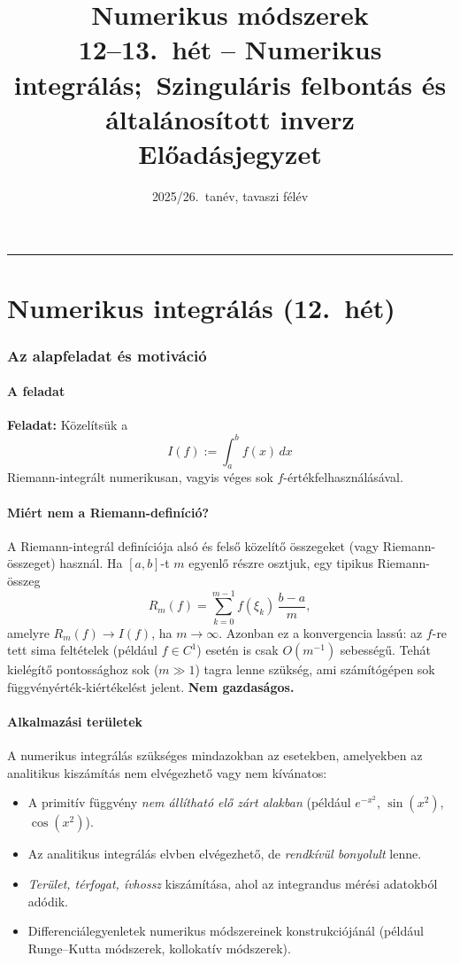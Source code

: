 \documentclass[a4paper,12pt]{article}
\title{\LARGE\bfseries Numerikus módszerek\\[6pt]
  \large 12--13.\ hét -- Numerikus integrálás;\
  Szinguláris felbontás és általánosított inverz\\[4pt]
  \normalsize Előadásjegyzet}
\date{2025/26.\ tanév, tavaszi félév}
\theoremstyle{mydef}
\begin{document}
\maketitle
\vspace{-1em}
\hrule
\vspace{0.5em}
\tableofcontents
\newpage

\part{Numerikus integrálás (12.\ hét)}

\section{Az alapfeladat és motiváció}

\subsection*{A feladat}

\textbf{Feladat:} Közelítsük a
\[
  I(f) := \int_a^b f(x)\,dx
\]
Riemann-integrált numerikusan, vagyis véges sok $f$-értékfelhasználásával.

\subsection*{Miért nem a Riemann-definíció?}

A Riemann-integrál definíciója alsó és felső közelítő összegeket (vagy Riemann-összeget) használ.
Ha $[a,b]$-t $m$ egyenlő részre osztjuk, egy tipikus Riemann-összeg
\[
  R_m(f) = \sum_{k=0}^{m-1} f(\xi_k)\,\frac{b-a}{m},
\]
amelyre $R_m(f)\to I(f)$, ha $m\to\infty$. Azonban ez a konvergencia lassú:
az $f$-re tett sima feltételek (például $f\in C^1$) esetén is csak $O(m^{-1})$
sebességű. Tehát kielégítő pontossághoz sok ($m\gg 1$) tagra lenne szükség,
ami számítógépen sok függvényérték-kiértékelést jelent. \textbf{Nem gazdaságos.}

\subsection*{Alkalmazási területek}

A numerikus integrálás szükséges mindazokban az esetekben, amelyekben az analitikus
kiszámítás nem elvégezhető vagy nem kívánatos:
\begin{itemize}[noitemsep,topsep=2pt]
  \item A primitív függvény \emph{nem állítható elő zárt alakban} (például $e^{-x^2}$,
        $\sin(x^2)$, $\cos(x^2)$).
  \item Az analitikus integrálás elvben elvégezhető, de \emph{rendkívül bonyolult}
        lenne.
  \item \emph{Terület, térfogat, ívhossz} kiszámítása, ahol az integrandus mérési
        adatokból adódik.
  \item Differenciálegyenletek numerikus módszereinek konstrukciójánál (például Runge--Kutta
        módszerek, kollokatív módszerek).
\end{itemize}
\end{document}
